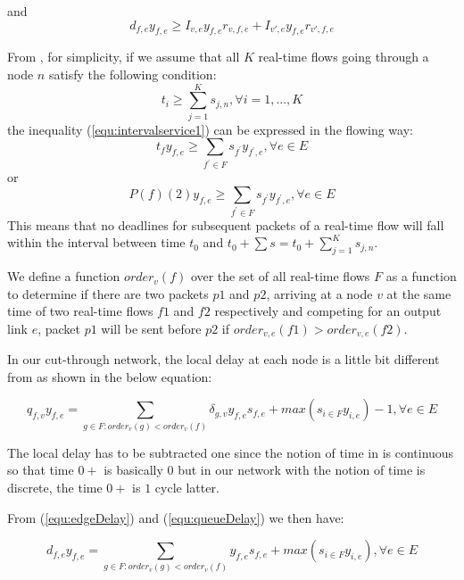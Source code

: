 \documentclass[a4]{article}
\begin{document}
and
\begin{equation} 
d_{f,e}y_{f,e} \geq I_{v,e}y_{f,e}r_{v,f,e} + I_{v',e}y_{f,e}r_{v',f,e}
\end{equation}

From \cite{Ferrari90ascheme}, for simplicity, if we assume that all $K$ 
real-time flows going through a node $n$ satisfy the following condition:
\begin{equation}\label{equ:intervalservice1}
t_i \geq \sum_{j=1}^Ks_{j,n}, \forall i = 1,...,K
\end{equation}
the inequality (\ref{equ:intervalservice1}) can be expressed in the flowing way:
\begin{equation}
t_f y_{f,e}\geq \sum_{f^{'} \in F} s_{f^{'}}y_{f^{'},e}, \forall e \in E
\end{equation}
or
\begin{equation}\label{equ:intervalservice3}
P(f)(2) y_{f,e}\geq \sum_{f^{'} \in F} s_{f^{'}}y_{f^{'},e}, \forall e \in E
\end{equation}
This means that no deadlines for subsequent packets of a real-time flow will fall within the interval 
between time $t_0$ and $t_0 + \sum s = t_0 + \sum_{j=1}^Ks_{j,n}$. 

We define a function $order_v(f)$ over the set of all real-time flows $F$
as a function to determine if there are two packets $p1$ and $p2$, arriving at a
node $v$ at the same time of two real-time flows $f1$ and $f2$ respectively
and competing for an output link $e$, packet $p1$ will be sent before $p2$ if
$order_{v,e}(f1) > order_{v,e}(f2)$.


In our cut-through network, the local delay at each node is a little bit
different from \cite{Ferrari90ascheme} as shown in the below equation:

\begin{equation}\label{equ:queueDelay}
q_{f,v}y_{f,e} = \sum_{g \in F:order_v(g) <
order_v(f)}\delta_{g,v}y_{f,e}s_{f,e} + max(s_{i \in F}y_{i,e})-1, \forall e \in
E
\end{equation}

The local delay has to be subtracted one since the notion of time in
\cite{Ferrari90ascheme} is continuous so that time $0+$ is basically $0$ but in
our network with the notion of time is discrete, the time $0+$ is $1$ cycle
latter.

From (\ref{equ:edgeDelay}) and (\ref{equ:queueDelay}) we then have:

\begin{equation}\label{equ:edgeDelay1}
d_{f,e}y_{f,e} = \sum_{g \in F:order_v(g) <
order_v(f)}y_{f,e}s_{f,e} + max(s_{i \in F}y_{i,e}), \forall e \in
E
\end{equation}
\end{document}
